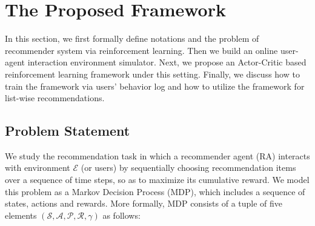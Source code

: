 \section{The Proposed Framework}
\label{sec:framework}

In this section, we first formally define notations and the problem of recommender system via reinforcement learning. Then we build an online user-agent interaction environment simulator. Next, we propose an Actor-Critic based reinforcement learning framework under this setting. Finally, we discuss how to train the framework via users' behavior log and how to utilize the framework for list-wise recommendations. 

\subsection{Problem Statement}
\label{sec:problem} 

We study the recommendation task in which a recommender agent (RA) interacts with environment $\mathcal{E}$ (or users) by sequentially choosing recommendation items over a sequence of time steps, so as to maximize its cumulative reward. We model this problem as a Markov Decision Process (MDP), which includes a sequence of states, actions and rewards. More formally, MDP consists of a tuple of five elements $(\mathcal{S}, \mathcal{A}, \mathcal{P}, \mathcal{R}, \gamma)$ as follows:

